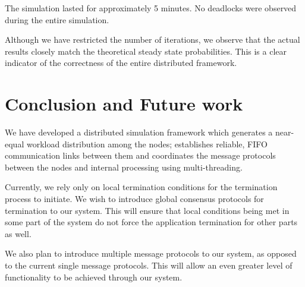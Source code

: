 \documentclass[12pt,a4paper]{article}
\begin{document}
The simulation lasted for approximately 5 minutes. No deadlocks were observed during the entire simulation.

Although we have restricted the number of iterations, we observe that the actual results closely match the theoretical steady state probabilities. This is a clear indicator of the correctness of the entire distributed framework.

\section{Conclusion and Future work}
We have developed a distributed simulation framework which generates a near-equal workload distribution among the nodes; establishes reliable, FIFO communication links between them and coordinates the message protocols between the nodes and internal processing using multi-threading.

Currently, we rely only on local termination conditions for the termination process to initiate. We wish to introduce global consensus protocols for termination to our system. This will ensure that local conditions being met in some part of the system do not force the application termination for other parts as well.

We also plan to introduce multiple message protocols to our system, as opposed to the current single message protocols. This will allow an even greater level of functionality to be achieved through our system.
 
\end{document}
